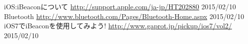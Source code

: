 \def\line{−\hspace*{-.7zw}−}

\begin{thebibliography}{99}


 iOS:iBeaconについて \url{http://support.apple.com/ja-jp/HT202880} 2015/02/10
 Bluetooth \url{http://www.bluetooth.com/Pages/Bluetooth-Home.aspx} 2015/02/10
 iOS7でiBeaconを使用してみよう! \url{http://www.gaprot.jp/pickup/ios7/vol2/} 2015/02/10

\end{thebibliography}
